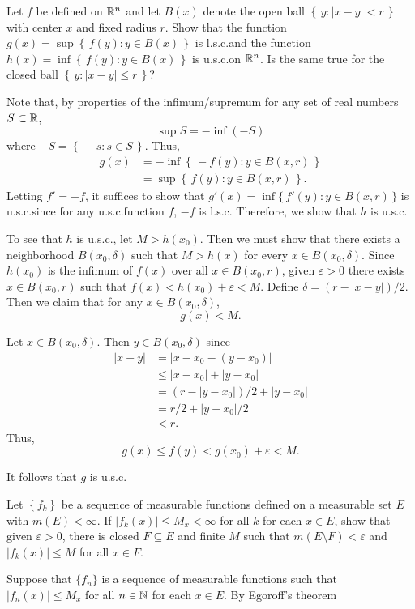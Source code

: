\begin{problem}
  Let $f$ be defined on $\mathbb{R}^n$ and let $B(x)$ denote the open ball
  $\left\{\,y:|x-y|<r\,\right\}$ with center $x$ and fixed radius $r$. Show
  that the function $g(x)=\sup\left\{\,f(y):y\in B(x)\,\right\}$ is
  l.s.c.\@ and the function $h(x)=\inf\left\{\,f(y):y\in B(x)\,\right\}$ is
  u.s.c.\@ on $\mathbb{R}^n$. Is the same true for the closed ball
  $\left\{\,y:|x-y|\leq r\,\right\}$?
\end{problem}
\begin{solution}
  Note that, by properties of the infimum/supremum for any set of real
  numbers $S\subset\mathbb{R}$,
  \[
    \sup S=-\inf (-S)
  \]
  where $-S=\left\{\,-s:s\in S\,\right\}$. Thus,
  \begin{align*}
    g(x)
    &=-\inf\left\{\,-f(y):y\in B(x,r)\,\right\}\\
    &=\sup\left\{\,f(y):y\in B(x,r)\, \right\}.
  \end{align*}
  Letting $f'=-f$, it suffices to show that $g'(x)=\inf\{\,f'(y):y\in
  B(x,r)\,\}$ is u.s.c.\@ since for any u.s.c.\@ function $f$, $-f$ is
  l.s.c. Therefore, we show that $h$ is u.s.c.

  To see that $h$ is u.s.c., let $M>h(x_0)$. Then we must show that there
  exists a neighborhood $B(x_0,\delta)$ such that $M>h(x)$ for every
  $x\in B(x_0,\delta)$. Since $h(x_0)$ is the infimum of $f(x)$ over all
  $x\in B(x_0,r)$, given $\varepsilon>0$ there exists $x\in B(x_0,r)$ such
  that $f(x)<h(x_0)+\varepsilon<M$. Define $\delta=(r-|x-y|)/2$. Then we
  claim that for any $x\in B(x_0,\delta)$,
  \[
    g(x)<M.
  \]
  \begin{subproof}
    Let $x\in B(x_0,\delta)$. Then $y\in B(x_0,\delta)$ since
    \begin{align*}
      |x-y|&=|x-x_0-(y-x_0)|\\
           &\leq |x-x_0|+|y-x_0|\\
           &=(r-|y-x_0|)/2+|y-x_0|\\
           &=r/2+|y-x_0|/2\\
           &<r.
    \end{align*}
    Thus,
    \[
      g(x)\leq f(y)<g(x_0)+\varepsilon<M.
    \]
  \end{subproof}
  It follows that $g$ is u.s.c.
\end{solution}

\begin{problem}
  Let $\left\{f_k\right\}$ be a sequence of measurable functions defined on
  a measurable set $E$ with $m(E)<\infty$. If $|f_k(x)|\leq M_x<\infty$ for
  all $k$ for each $x\in E$, show that given $\varepsilon>0$, there is
  closed $F\subseteq E$ and finite $M$ such that
  $m(E\setminus F)<\varepsilon$ and $|f_k(x)|\leq M$ for all $x\in F$.
\end{problem}
\begin{solution}
  Suppose that $\{f_n\}$ is a sequence of measurable functions such that
  $|f_n(x)|\leq M_x$ for all $n\in\mathbb{N}$ for each $x\in E$. By Egoroff's
  theorem
\end{solution}

